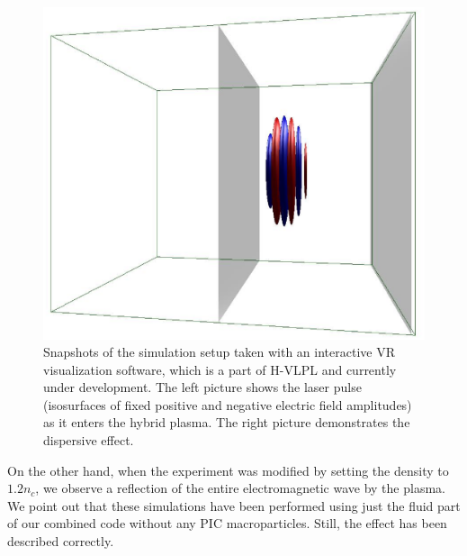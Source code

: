\documentclass[conference]{IEEEtran}
\renewcommand{\~}{\widetilde }
\begin{document}
\begin{figure}[H]
\begin{minipage}{0.48\columnwidth}
\begin{center}
			\includegraphics[width=1.0\columnwidth]{frame_disp001.ps}
		\end{center}
	\end{minipage}%
	\caption{Snapshots of the simulation setup taken with an interactive VR visualization software, which is a part of H-VLPL and currently under development. The left picture 
		shows the laser pulse (isosurfaces of fixed positive and negative electric field amplitudes) as it enters the hybrid plasma. The right picture demonstrates the dispersive
		effect. }
	\label{disp}
\end{figure}

On the other hand, when the experiment was modified by setting the density to $1.2 n_c$, we observe a reflection of the entire electromagnetic wave by the plasma. \\
We point out that these simulations have been performed using just the fluid part of our combined code without any PIC macroparticles. Still, the effect has been described
correctly.
\end{document}
